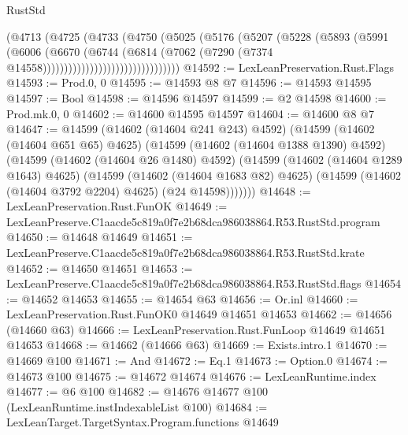 \begin{lexlean}{RustStd}
\begin{coremodule}
                                  (@4713
                                    (@4725
                                      (@4733
                                        (@4750
                                          (@5025
                                            (@5176
                                              (@5207
                                                (@5228
                                                  (@5893
                                                    (@5991
                                                      (@6006
                                                        (@6670
                                                          (@6744
                                                            (@6814
                                                              (@7062
                                                                (@7290
                                                                  (@7374
                                                                    @14558))))))))))))))))))))))))))))))))
@14592 := LexLeanPreservation.Rust.Flags
@14593 := Prod.{0, 0}
@14595 := @14593 @8 @7
@14596 := @14593 @14595
@14597 := Bool
@14598 := @14596 @14597
@14599 := @2 @14598
@14600 := Prod.mk.{0, 0}
@14602 := @14600 @14595 @14597
@14604 := @14600 @8 @7
@14647 := @14599
    (@14602 (@14604 @241 @243) @4592)
    (@14599
      (@14602 (@14604 @651 @65) @4625)
      (@14599
        (@14602 (@14604 @1388 @1390) @4592)
        (@14599
          (@14602 (@14604 @26 @1480) @4592)
          (@14599
            (@14602 (@14604 @1289 @1643) @4625)
            (@14599
              (@14602 (@14604 @1683 @82) @4625)
              (@14599 (@14602 (@14604 @3792 @2204) @4625) (@24 @14598)))))))
@14648 := LexLeanPreservation.Rust.FunOK
@14649 := LexLeanPreserve.C1aacde5c819a0f7e2b68dca986038864.R53.RustStd.program
@14650 := @14648 @14649
@14651 := LexLeanPreserve.C1aacde5c819a0f7e2b68dca986038864.R53.RustStd.krate
@14652 := @14650 @14651
@14653 := LexLeanPreserve.C1aacde5c819a0f7e2b68dca986038864.R53.RustStd.flags
@14654 := @14652 @14653
@14655 := @14654 @63
@14656 := Or.inl
@14660 := LexLeanPreservation.Rust.FunOK0 @14649 @14651 @14653
@14662 := @14656 (@14660 @63)
@14666 := LexLeanPreservation.Rust.FunLoop @14649 @14651 @14653
@14668 := @14662 (@14666 @63)
@14669 := Exists.intro.{1}
@14670 := @14669 @100
@14671 := And
@14672 := Eq.{1}
@14673 := Option.{0}
@14674 := @14673 @100
@14675 := @14672 @14674
@14676 := LexLeanRuntime.index
@14677 := @6 @100
@14682 := @14676 @14677 @100 (LexLeanRuntime.instIndexableList @100)
@14684 := LexLeanTarget.TargetSyntax.Program.functions @14649

\end{coremodule}
\end{lexlean}
